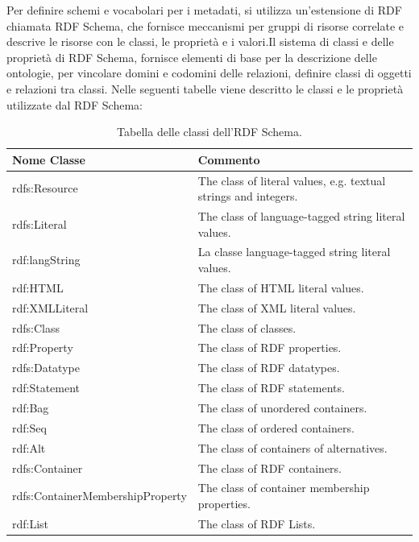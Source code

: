\documentclass[a4paper,11pt]{article}
\begin{document}
Per definire schemi e vocabolari per i metadati, si utilizza un'estensione di RDF chiamata RDF Schema, che fornisce meccanismi per gruppi di risorse correlate e descrive le risorse con le classi, le proprietà e i valori.\newline Il sistema di classi e delle proprietà di RDF Schema, fornisce elementi di base per la descrizione delle ontologie, per vincolare domini e codomini delle relazioni, definire classi di oggetti e relazioni tra classi.
Nelle seguenti tabelle viene descritto le classi e le proprietà utilizzate dal RDF Schema:	\newline		
\begin{table}[!htb]
\begin{center}				
\begin{tabular}{|>{\small}l|>{\small}l|}
	\hline
	\textbf{Nome Classe} & \textbf{Commento}\\				
	\hline 	rdfs:Resource & The class of literal values, e.g. textual strings and integers.\\	
	\hline rdfs:Literal & 	The class of language-tagged string literal values.\\ 			\hline rdf:langString & La classe  language-tagged string literal values.\\			\hline rdf:HTML &	The class of HTML literal values.\\
	\hline rdf:XMLLiteral	& The class of XML literal values.\\
	\hline rdfs:Class & The class of classes.\\
	\hline rdf:Property & The class of RDF properties.\\
	\hline rdfs:Datatype &	The class of RDF datatypes.\\
	\hline rdf:Statement & The class of RDF statements.\\
	\hline rdf:Bag	& The class of unordered containers.\\
	\hline rdf:Seq	& The class of ordered containers.\\
	\hline rdf:Alt	& The class of containers of alternatives.\\
	\hline rdfs:Container & The class of RDF containers.\\
	\hline rdfs:ContainerMembershipProperty & The class of container membership properties.\\
	\hline rdf:List &	The class of RDF Lists.\\
	\hline			
\end{tabular}	
\caption{Tabella delle classi dell'RDF Schema.}	
\end{center}	
\end{table}
\end{document}
